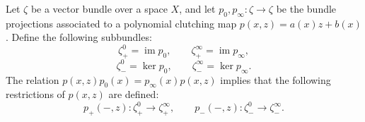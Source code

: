 Let $\zeta$ be a vector bundle over a space $X$, and let $p_0, p_\infty: \zeta \to \zeta$ be the bundle projections associated to a polynomial clutching map $p(x,z) = a(x)z + b(x)$. Define the following subbundles:
$$
\zeta_+^0 = \operatorname{im} p_0, \qquad
\zeta_+^\infty = \operatorname{im} p_\infty,
$$
$$
\zeta_-^0 = \ker p_0, \qquad
\zeta_-^\infty = \ker p_\infty.
$$
The relation $p(x,z) p_0(x) = p_\infty(x) p(x,z)$ implies that the following restrictions of $p(x,z)$ are defined:
$$
p_+(-,z): \zeta_+^0 \to \zeta_+^\infty, \qquad
p_-(-,z): \zeta_-^0 \to \zeta_-^\infty.
$$

